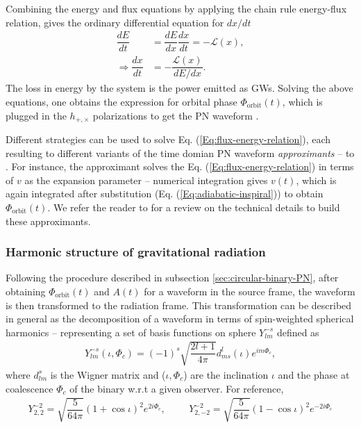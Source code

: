 Combining the energy and flux equations by applying the chain rule energy-flux relation, gives the ordinary differential equation for $dx/dt$  
\begin{align}
    \dfrac{dE}{dt} &= \dfrac{dE}{dx}\dfrac{dx}{dt} = -\mathcal{L}(x), \\
    \Rightarrow \dfrac{dx}{dt} &= -\dfrac{\mathcal{L}(x)}{dE/dx}. \label{Eq:flux-energy-relation}
\end{align}
The loss in energy by the system is the power emitted as GWs. Solving the above equations, one obtains the expression for orbital phase $\Phi_{\text{orbit}}(t)$, which is plugged in the $h_{+,\times}$ polarizations to get the PN waveform \cite{Blanchet:2013haa}.  

Different strategies can be used to solve Eq. (\ref{Eq:flux-energy-relation}), each resulting to different variants of the time domian PN waveform \textit{approximants} --   to . For instance, the  approximant \cite{Blanchet:2004ek} solves the Eq. (\ref{Eq:flux-energy-relation}) in terms of $v$ as the expansion parameter -- numerical integration gives $v(t)$, which is again integrated after substitution (Eq. (\ref{Eq:adiabatic-inspiral})) to obtain $\Phi_{\text{orbit}}(t)$. We refer the reader to \cite{Buonanno:2009zt} for a review on the technical details to build these approximants. 




\subsubsection{Harmonic structure of gravitational radiation}\label{sec:HMs-sec}
Following the procedure described in subsection \ref{sec:circular-binary-PN}, after obtaining $\Phi_{\text{orbit}}(t)$ and $A(t)$ for a waveform in the source frame, the waveform is then transformed to the radiation frame. This transformation can be described in general as the decomposition of a waveform in terms of spin-weighted spherical harmonics -- representing a set of basis functions on sphere $Y_{lm}^{-s}$ defined as \cite{Brown:2007jx}
\begin{align}
    Y_{lm}^{-s}(\iota,\Phi_c) = (-1)^{s}\sqrt{\dfrac{2l+1}{4\pi}}d^{l}_{ms}(\iota)e^{im\Phi_c},
\end{align}
where $d^{s}_{lm}$ is the Wigner matrix and ($\iota, \Phi_{c}$) are the inclination $\iota$ and the phase at coalescence $\Phi_c$ of the binary w.r.t a given observer. For reference,
\begin{align}
    Y_{2,2}^{-2} = \sqrt{\dfrac{5}{64\pi}}(1+\cos\iota)^2e^{2i\Phi_c}, \hspace{1cm} Y_{2,-2}^{-2} = \sqrt{\dfrac{5}{64\pi}}(1-\cos \iota)^2e^{-2i\Phi_c}
\end{align}

